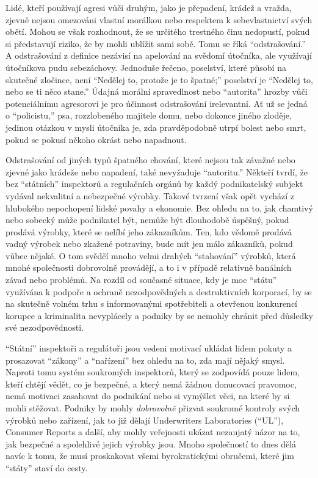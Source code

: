 \documentclass{book}
\begin{document}
Lidé, kteří používají agresi vůči druhým, jako je přepadení, krádež a vražda, zjevně nejsou omezováni vlastní morálkou nebo respektem k sebevlastnictví svých obětí. Mohou se však rozhodnout, že se určitého trestného činu nedopustí, pokud si představují riziko, že by mohli ublížit sami sobě. Tomu se říká \enquote{odstrašování.} A odstrašování z definice nezávisí na apelování na svědomí útočníka, ale využívají útočníkova pudu sebezáchovy. Jednoduše řečeno, poselství, které působí na skutečné zločince, není \enquote{Nedělej to, protože je to špatné;} poselství je \enquote{Nedělej to, nebo se ti něco stane.} Údajná morální spravedlnost nebo \enquote{autorita} hrozby vůči potenciálnímu agresorovi je pro účinnost odstrašování irelevantní. Ať už se jedná o \enquote{policistu,} psa, rozzlobeného majitele domu, nebo dokonce jiného zloděje, jedinou otázkou v mysli útočníka je, zda pravděpodobně utrpí bolest nebo smrt, pokud se pokusí někoho okrást nebo napadnout.

Odstrašování od jiných typů špatného chování, které nejsou tak závažné nebo zjevné jako krádeže nebo napadení, také nevyžaduje \enquote{autoritu.} Někteří tvrdí, že bez \enquote{státních} inspektorů a regulačních orgánů by každý podnikatelský subjekt vydával nekvalitní a nebezpečné výrobky. Takové tvrzení však opět vychází z hlubokého nepochopení lidské povahy a ekonomie. Bez ohledu na to, jak chamtivý nebo sobecký může podnikatel být, nemůže být dlouhodobě úspěšný, pokud prodává výrobky, které se nelíbí jeho zákazníkům. Ten, kdo vědomě prodává vadný výrobek nebo zkažené potraviny, bude mít jen málo zákazníků, pokud vůbec nějaké. O tom svědčí mnoho velmi drahých \enquote{stahování} výrobků, která mnohé společnosti dobrovolně provádějí, a to i v případě relativně banálních závad nebo problémů. Na rozdíl od současné situace, kdy je moc \enquote{státu} využívána k podpoře a ochraně nezodpovědných a destruktivních korporací, by se na skutečně volném trhu s informovanými spotřebiteli a otevřenou konkurencí korupce a kriminalita nevyplácely a podniky by se nemohly chránit před důsledky své nezodpovědnosti.

\enquote{Státní} inspektoři a regulátoři jsou vedeni motivací ukládat lidem pokuty a prosazovat \enquote{zákony} a \enquote{nařízení} bez ohledu na to, zda mají nějaký smysl. Naproti tomu systém soukromých inspektorů, který se zodpovídá pouze lidem, kteří chtějí vědět, co je bezpečné, a který nemá žádnou donucovací pravomoc, nemá motivaci zasahovat do podnikání nebo si vymýšlet věci, na které by si mohli stěžovat. Podniky by mohly \emph{dobrovolně} přizvat soukromé kontroly svých výrobků nebo zařízení, jak to již dělají Underwriters Laboratories (\enquote{UL}), Consumer Reports a další, aby mohly veřejnosti ukázat nezaujatý názor na to, jak bezpečné a spolehlivé jejich výrobky jsou. Mnoho společností to dnes dělá navíc k tomu, že musí proskakovat všemi byrokratickými obručemi, které jim \enquote{státy} staví do cesty.
\end{document}
